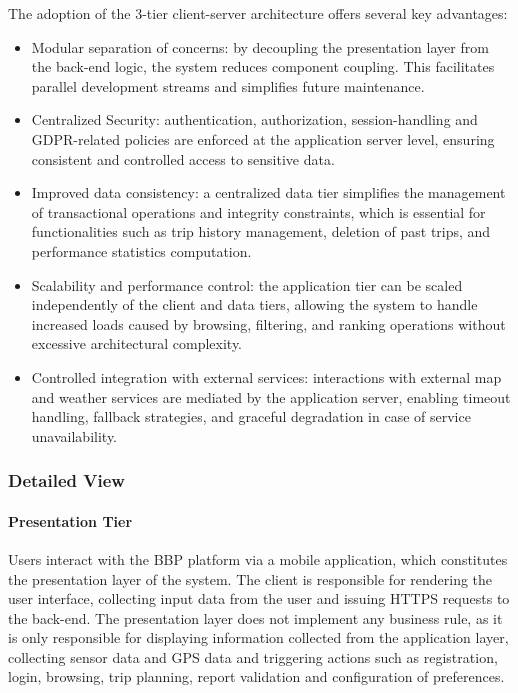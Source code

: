 \vspace{0.5cm}\noindent
The adoption of the 3-tier client-server architecture offers several key advantages:
\begin{itemize}
    \item Modular separation of concerns: by decoupling the presentation layer from the back-end logic, the system reduces component coupling. This facilitates parallel development streams and simplifies future maintenance.
    \item Centralized Security: authentication, authorization, session-handling and GDPR-related policies are enforced at the application server level, ensuring consistent and controlled access to sensitive data.
    \item Improved data consistency: a centralized data tier simplifies the management of transactional operations and integrity constraints, which is essential for functionalities such as trip history management, deletion of past trips, and performance statistics computation.
    \item Scalability and performance control: the application tier can be scaled independently of the client and data tiers, allowing the system to handle increased loads caused by browsing, filtering, and ranking operations without excessive architectural complexity.
    \item Controlled integration with external services: interactions with external map and weather services are mediated by the application server, enabling timeout handling, fallback strategies, and graceful degradation in case of service unavailability.
\end{itemize}

\subsubsection{Detailed View}
\paragraph{Presentation Tier} Users interact with the BBP platform via a mobile application, which constitutes the presentation layer of the system. The client is responsible for rendering the user interface, collecting input data from the user and issuing HTTPS requests to the back-end. The presentation layer does not implement any business rule, as it is only responsible for displaying information collected from the application layer, collecting sensor data and GPS data and triggering actions such as registration, login, browsing, trip planning, report validation and configuration of preferences.

